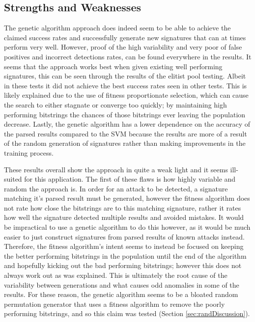\subsection{Strengths and Weaknesses} \label{sec:genDisadvantages}

The genetic algorithm approach does indeed seem to be able to achieve the claimed success rates and successfully generate new signatures that can at times perform very well.  However, proof of the high variability and very poor of false positives and incorrect detections rates, can be found everywhere in the results.  It seems that the approach works best when given existing well performing signatures, this can be seen through the results of the elitist pool testing.  Albeit in these tests it did not achieve the best success rates seen in other tests.  This is likely explained due to the use of fitness proportionate selection, which can cause the search to either stagnate or converge too quickly; by maintaining high performing bitstrings the chances of those bitstrings ever leaving the population decrease.\cite{selectionPressure}  Lastly, the genetic algorithm has a lower dependence on the accuracy of the parsed results compared to the SVM because the results are more of a result of the random generation of signatures rather than making improvements in the training process.

These results overall show the approach in quite a weak light and it seems ill-suited for this application.  The first of these flaws is how highly variable and random the approach is.  In order for an attack to be detected, a signature matching it's parsed result must be generated, however the fitness algorithm does not rate how close the bitstrings are to this matching signature, rather it rates how well the signature detected multiple results and avoided mistakes.  It would be impractical to use a genetic algorithm to do this however, as it would be much easier to just construct signatures from parsed results of known attacks instead.  Therefore,  the fitness algorithm's intent seems to instead be focused on keeping the better performing bitstrings in the population until the end of the algorithm and hopefully kicking out the bad performing bitstrings; however this does not always work out as was explained.  This is ultimately the root cause of the variability between generations and what causes odd anomalies in some of the results.  For these reason, the genetic algorithm seems to be a bloated random permutation generator that uses a fitness algorithm to remove the poorly performing bitstrings, and so this claim was tested (Section \ref{sec:randDiscussion}).


